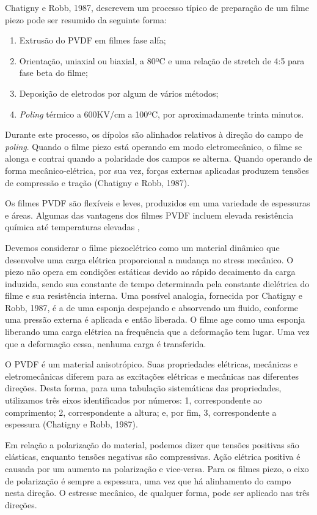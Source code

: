 \documentclass[
	12pt,				
	oneside,			
	a4paper,			
	english,			
	brazil				
	]{abntex2ppgsi}
\begin{document}
Chatigny e Robb, 1987, descrevem um processo típico de preparação de um filme piezo pode ser resumido da seguinte forma:

\begin{enumerate}
	\item Extrusão do PVDF em filmes fase alfa; 
	\item Orientação, uniaxial ou biaxial, a 80ºC e uma relação de stretch de 4:5 para fase beta do filme;
	\item Deposição de eletrodos por algum de vários métodos;
	\item \textit{Poling} térmico a 600KV/cm a 100ºC, por aproximadamente trinta minutos.
\end{enumerate}

Durante este processo, os dípolos são alinhados relativos à direção do campo de \textit{poling}. Quando o filme piezo está operando em modo eletromecânico, o filme se alonga e contrai quando a polaridade dos campos se alterna. Quando operando de forma mecânico-elétrica, por sua vez, forças externas aplicadas produzem tensões de compressão e tração (Chatigny e Robb, 1987). 

Os filmes PVDF são flexíveis e leves, produzidos em uma variedade de espessuras e áreas. Algumas das vantagens dos filmes PVDF incluem elevada resistência química até temperaturas elevadas , 

Devemos considerar o filme piezoelétrico como um material dinâmico que desenvolve uma carga elétrica proporcional a mudança no stress mecânico. O piezo não opera em condições estáticas devido ao rápido decaimento da carga induzida, sendo sua constante de tempo determinada pela constante dielétrica do filme e sua resistência interna. 	Uma possível analogia, fornecida por Chatigny e Robb, 1987, é a de uma esponja despejando e absorvendo um fluido, conforme uma pressão externa é aplicada e então liberada. O filme age como uma esponja liberando uma carga elétrica na frequência que a deformação tem lugar. Uma vez que a deformação cessa, nenhuma carga é transferida. 

O PVDF é um material anisotrópico.  Suas propriedades elétricas, mecânicas e eletromecânicas diferem para as excitações elétricas e mecânicas nas diferentes direções. Desta forma, para uma tabulação sistemáticas das propriedades, utilizamos três eixos identificados por números: 1, correspondente ao comprimento; 2, correspondente a altura; e, por fim, 3, correspondente a espessura (Chatigny e Robb, 1987). 

Em relação a polarização do material, podemos dizer que tensões positivas são elásticas, enquanto tensões negativas são compressivas. Ação elétrica positiva é causada por um aumento na polarização e vice-versa. Para os filmes piezo, o eixo de polarização é sempre a espessura, uma vez que há alinhamento do campo nesta direção. O estresse mecânico, de qualquer forma, pode ser aplicado nas três direções. 
\end{document}
